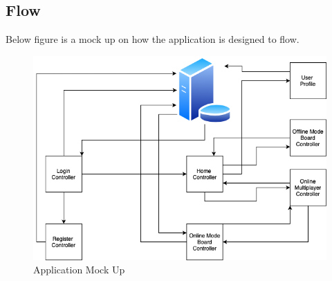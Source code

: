 \documentclass{article}
\begin{document}
    \subsection{Flow}
        Below figure is a mock up on how the application is designed to flow.\\ 
        \begin{figure}[h]
        \centering
        \includegraphics[width=5in]{images/tictacreflexdiagram.png}
        \caption{Application Mock Up}
        \end{figure}
        ~\newline
        ~\newpage
\end{document}
